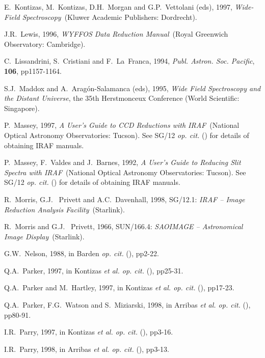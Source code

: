 \documentclass[twoside,11pt]{article}
\newcommand{\xref}[3]{#1}
\begin{document}
\begin{thebibliography}{99}
   E.~Kontizas, M.~Kontizas, D.H.~Morgan and
   G.P.~Vettolani (eds), 1997, {\it Wide-Field Spectroscopy}\,
   (Kluwer Academic Publishers: Dordrecht).

   J.R.~Lewis, 1996, {\it WYFFOS Data Reduction
   Manual}\, (Royal Greenwich Observatory: Cambridge).

   C.~Lissandrini, S.~Cristiani and F.~La~Franca,
   1994, {\it  Publ. Astron. Soc. Pacific}, {\bf 106}, pp1157-1164.

   S.J.~Maddox and A.~Arag\'{o}n-Salamanca (eds),
   1995, {\it Wide Field Spectroscopy and the Distant Universe},
   the 35th Herstmonceux Conference (World Scientific: Singapore).

   P.~Massey, 1997, {\it A User's Guide to CCD
   Reductions with IRAF}\, (National Optical Astronomy Observatories:
   Tucson).  See \xref{SG/12}{sg12}{} {\it op. cit.}\/ (\cite{SG12})
   for details of obtaining IRAF manuals.

   P.~Massey, F.~Valdes and J.~Barnes, 1992, {\it
   A User's Guide to Reducing Slit Spectra with IRAF}\, (National
   Optical Astronomy Observatories: Tucson).  See \xref{SG/12}{sg12}{}
   {\it op. cit.}\/ (\cite{SG12}) for details of obtaining IRAF manuals.

   R.~Morris, G.J.~ Privett and A.C.~Davenhall, 1998,
   \xref{SG/12.1}{sg12}{}: {\it IRAF -- Image Reduction Analysis Facility}\,
   (Starlink).

   R.~Morris and G.J.~ Privett, 1966,
   \xref{SUN/166.4}{sun166}{}: {\it SAOIMAGE -- Astronomical Image Display}\,
   (Starlink).

   G.W.~Nelson, 1988, in Barden {\it op. cit.}\/
   (\cite{BARDEN88}), pp2-22.

   Q.A.~Parker, 1997, in Kontizas {\it et al. op.
   cit.}\/ (\cite{KONTIZAS97}), pp25-31.

   Q.A.~Parker and M.~Hartley, 1997, in Kontizas {\it
   et al. op. cit.}\/ (\cite{KONTIZAS97}), pp17-23.

   Q.A.~Parker, F.G.~Watson and S.~Miziarski, 1998, in 
   Arribas {\it et al. op. cit.}\/ (\cite{ARRIBAS98}), pp80-91.

   I.R.~Parry, 1997, in Kontizas {\it et al. op. cit.}\/
   (\cite{KONTIZAS97}), pp3-16.

   I.R.~Parry, 1998, in Arribas {\it et al. op. cit.}\/
   (\cite{ARRIBAS98}), pp3-13.


\end{thebibliography}
\end{document}
